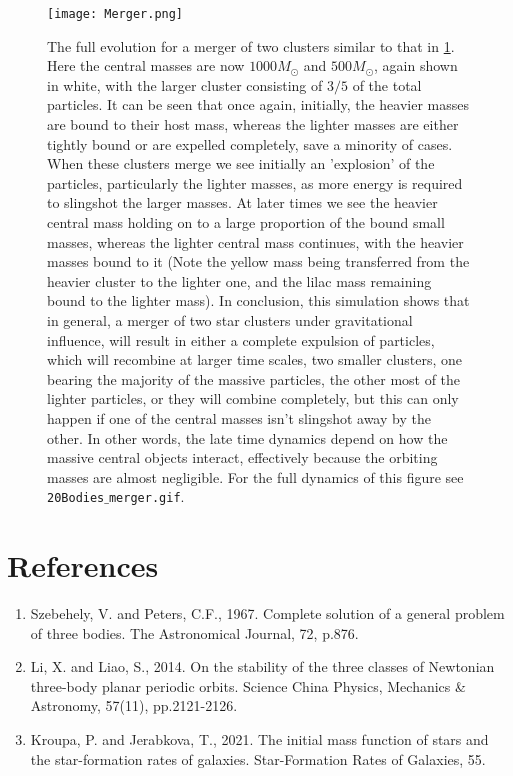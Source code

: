 \documentclass[11pt]{article}
\begin{document}
\begin{figure}[H]
\centering
	\texttt{[image: Merger.png]}
\caption{The full evolution for a merger of two clusters similar to that in \ref{SingleClust}. Here the central masses are now $1000M_{\odot}$ and $500M_{\odot}$, again shown in white, with the larger cluster consisting of $3/5$ of the total particles. It can be seen that once again, initially, the heavier masses are bound to their host mass, whereas the lighter masses are either tightly bound or are expelled completely, save a minority of cases. When these clusters merge we see initially an 'explosion' of the particles, particularly the lighter masses, as more energy is required to slingshot the larger masses. At later times we see the heavier central mass holding on to a large proportion of the bound small masses, whereas the lighter central mass continues, with the heavier masses bound to it (Note the yellow mass being transferred from the heavier cluster to the lighter one, and the lilac mass remaining bound to the lighter mass). In conclusion, this simulation shows that in general, a merger of two star clusters under gravitational influence, will result in either a complete expulsion of particles, which will recombine at larger time scales, two smaller clusters, one bearing the majority of the massive particles, the other most of the lighter particles, or they will combine completely, but this can only happen if one of the central masses isn't slingshot away by the other. In other words, the late time dynamics depend on how the massive central objects interact, effectively because the orbiting masses are almost negligible. For the full dynamics of this figure see \texttt{20Bodies$\_$merger.gif}.}
\label{SingleClust}
\end{figure}

\section{References}
\begin{enumerate}
\item Szebehely, V. and Peters, C.F., 1967. Complete solution of a general problem of three bodies. The Astronomical Journal, 72, p.876.
\item Li, X. and Liao, S., 2014. On the stability of the three classes of Newtonian three-body planar periodic orbits. Science China Physics, Mechanics \& Astronomy, 57(11), pp.2121-2126.
\item Kroupa, P. and Jerabkova, T., 2021. The initial mass function of stars and the star-formation rates of galaxies. Star-Formation Rates of Galaxies, 55.
\end{enumerate}
\end{document}
